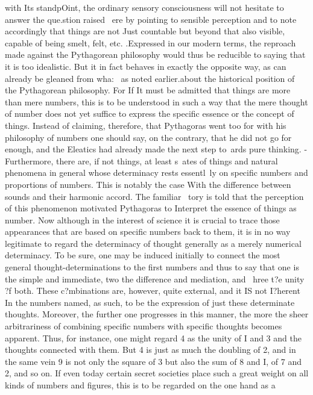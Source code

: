 {{with Its standpOint, the ordinary sensory consciousness will not hesitate to answer
the que.stion raised ~ere by pointing to sensible perception and to note accordingly
that things are not Just countable but beyond that also visible, capable of being
smelt, felt, etc. .Expressed in our modern terms, the reproach made against the
Pythagorean philosophy would thus be reducible to saying that it is too idealistic.
But it in fact behaves in exactly the opposite way, as can already be gleaned from
wha: ~as noted earlier.about the historical position of the Pythagorean philosophy.
For If It must be admitted that things are more than mere numbers, this is to be
understood in such a way that the mere thought of number does not yet suffice to
express the specific essence or the concept of things. Instead of claiming, therefore,
that Pythagoras went too for with his philosophy of numbers one should say, on
the contrary, that he did not go for enough, and the Eleatics had already made
the next step to~ards pure thinking. - Furthermore, there are, if not things, at
least s~ates of things and natural phenomena in general whose determinacy rests
essentl~ly on specific numbers and proportions of numbers. This is notably the
case With the difference between sounds and their harmonic accord. The familiar
~tory is told that the perception of this phenomenon motivated Pythagoras to
Interpret the essence of things as number. Now although in the interest of science
it is crucial to trace those appearances that are based on specific numbers back to
them, it is in no way legitimate to regard the determinacy of thought generally
as a merely numerical determinacy. To be sure, one may be induced initially to
connect the most general thought-determinations to the first numbers and thus to
say that one is the simple and immediate, two the difference and mediation, and
~hree t?e unity ?f both. These c?mbinations are, however, quite external, and it
IS not I?herent In the numbers named, as such, to be the expression of just these
determinate thoughts. Moreover, the further one progresses in this manner, the
more the sheer arbitrariness of combining specific numbers with specific thoughts becomes apparent. Thus, for instance, one might regard 4 as the unity of I and 3
and the thoughts connected with them. But 4 is just as much the doubling of 2,
and in the same vein 9 is not only the square of 3 but also the sum of 8 and I, of
7 and 2, and so on. If even today certain secret societies place such a great weight
on all kinds of numbers and figures, this is to be regarded on the one hand as a
}}
